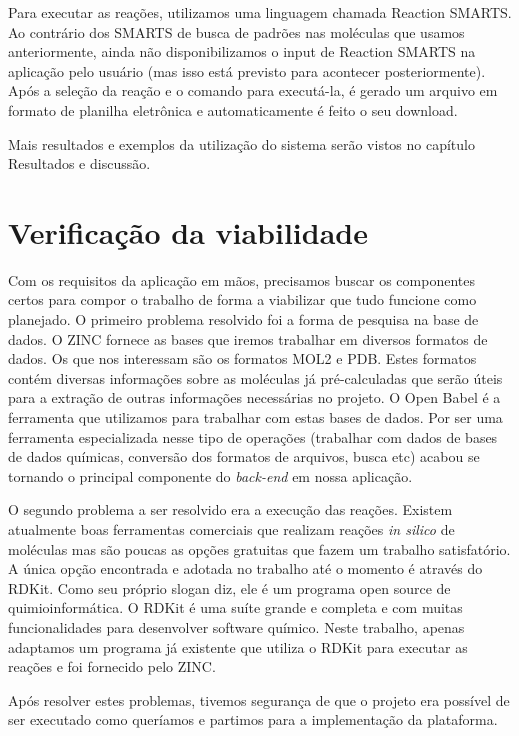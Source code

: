 \documentclass{abnt}
\begin{document}
Para executar as reações, utilizamos uma linguagem chamada Reaction SMARTS. Ao contrário
dos SMARTS de busca de padrões nas moléculas que usamos anteriormente, ainda não
disponibilizamos o input de Reaction SMARTS na aplicação pelo usuário (mas isso
está previsto para acontecer posteriormente). Após a seleção da reação e o comando
para executá-la, é gerado um arquivo em formato de planilha eletrônica e automaticamente
é feito o seu download.

Mais resultados e exemplos da utilização do sistema serão vistos no capítulo Resultados
e discussão.

\section{Verificação da viabilidade}

Com os requisitos da aplicação em mãos, precisamos buscar os componentes certos
para compor o trabalho de forma a viabilizar que tudo funcione como planejado. O
primeiro problema resolvido foi a forma de pesquisa na base de dados. O ZINC fornece
as bases que iremos trabalhar em diversos formatos de dados. Os que nos interessam
são os formatos MOL2 e PDB\cite{westbrook2003pdb}. Estes formatos contém diversas informações sobre as
moléculas já pré-calculadas que serão úteis para a extração de outras informações
necessárias no projeto. O Open Babel é a ferramenta que utilizamos para trabalhar
com estas bases de dados. Por ser uma ferramenta especializada nesse tipo de operações
(trabalhar com dados de bases de dados químicas, conversão dos formatos de arquivos,
busca etc) acabou se tornando o principal componente do \textit{back-end} em nossa aplicação.

O segundo problema a ser resolvido era a execução das reações. Existem atualmente
boas ferramentas comerciais que realizam reações \textit{in silico} de moléculas mas são
poucas as opções gratuitas que fazem um trabalho satisfatório. A única opção encontrada
e adotada no trabalho até o momento é através do RDKit. Como seu próprio slogan diz,
ele é um programa open source de quimioinformática. O RDKit é uma suíte grande e
completa e com muitas funcionalidades para desenvolver software químico. Neste trabalho,
apenas adaptamos um programa já existente que utiliza o RDKit para executar as reações
e foi fornecido pelo ZINC.

Após resolver estes problemas, tivemos segurança de que o projeto era possível de
ser executado como queríamos e partimos para a implementação da plataforma.
\end{document}
